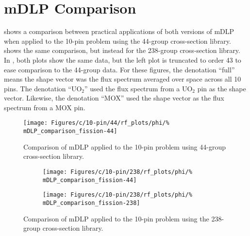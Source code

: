 
\section{mDLP Comparison}

 shows a comparison between practical applications of 
both versions of mDLP when applied to the 10-pin problem using the 44-group 
cross-section library.   shows the same comparison, 
but instead for the 238-group cross-section library.  In 
, both plots show 
the 
same data, but the left plot is truncated to order 43 to ease comparison to the 
44-group data. For these figures, the denotation ``full'' means the shape 
vector was the flux spectrum averaged over space across all 10 pins.  The 
denotation ``UO$_2$'' used the flux spectrum from a UO$_2$ pin as the 
shape vector.  Likewise, the denotation ``MOX'' used the shape vector as the 
flux spectrum from a MOX pin.

\begin{figure*}[tb]
    \centering
    \texttt{[image: Figures/c/10-pin/44/rf\_plots/phi/\%
        mDLP\_comparison\_fission-44]}
    \caption{Comparison of mDLP applied to the 10-pin problem using 44-group 
        cross-section library.}
    \label{fig:mDLP_44}
\end{figure*}

\begin{figure*}[tb]
    \centering
    \begin{subfigure}{0.5\textwidth}
        \centering
        \texttt{[image: Figures/c/10-pin/238/rf\_plots/phi/\%
        mDLP\_comparison\_fission-44]}
    \end{subfigure}%
    \begin{subfigure}{0.5\textwidth}
        \centering
        \texttt{[image: Figures/c/10-pin/238/rf\_plots/phi/\%
        mDLP\_comparison\_fission-238]}
    \end{subfigure}
    \caption{Comparison of mDLP applied to the 10-pin problem using the 
        238-group cross-section library.}
    \label{fig:mDLP_238}
\end{figure*}

